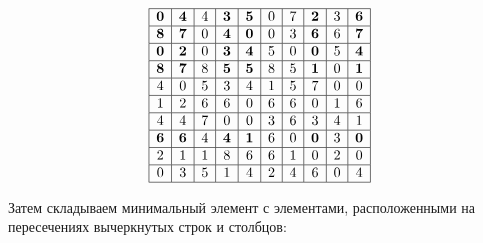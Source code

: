 \documentclass[17pt]{extarticle}
\begin{document}
\[
    \begin{array}{|*{10}{c|}}
        \hline
        \textbf{0} & \textbf{4} & 4 & \textbf{3} & \textbf{5} & 0 & 7 & \textbf{2} & 3 & \textbf{6} \\
        \hline
        \textbf{8} & \textbf{7} & 0 & \textbf{4} & \textbf{0} & 0 & 3 & \textbf{6} & 6 & \textbf{7} \\
        \hline
        \textbf{0} & \textbf{2} & 0 & \textbf{3} & \textbf{4} & 5 & 0 & \textbf{0} & 5 & \textbf{4} \\
        \hline
        \textbf{8} & \textbf{7} & 8 & \textbf{5} & \textbf{5} & 8 & 5 & \textbf{1} & 0 & \textbf{1} \\
        \hline
        4          & 0          & 5 & 3          & 4          & 1 & 5 & 7          & 0 & 0          \\
        \hline
        1          & 2          & 6 & 6          & 0          & 6 & 6 & 0          & 1 & 6          \\
        \hline
        4          & 4          & 7 & 0          & 0          & 3 & 6 & 3          & 4 & 1          \\
        \hline
        \textbf{6} & \textbf{6} & 4 & \textbf{4} & \textbf{1} & 6 & 0 & \textbf{0} & 3 & \textbf{0} \\
        \hline
        2          & 1          & 1 & 8          & 6          & 6 & 1 & 0          & 2 & 0          \\
        \hline
        0          & 3          & 5 & 1          & 4          & 2 & 4 & 6          & 0 & 4          \\
        \hline
    \end{array}
\]

Затем складываем минимальный элемент с элементами, расположенными на пересечениях вычеркнутых строк и столбцов:
\end{document}
